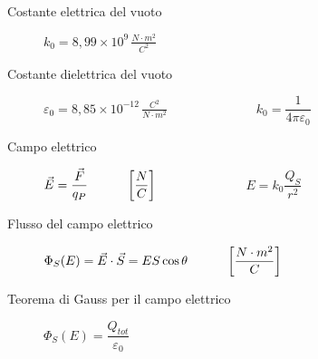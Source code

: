 \documentclass[a4paper,11pt,italian]{article}
\begin{document}
\begin{description}
   \item[Costante elettrica del vuoto ] $ k_0 = 8,99 \times 10^9 \, \frac{N\cdot m^2}{C^2} $
  
  \item[Costante dielettrica del vuoto] $ \varepsilon_0 = 8,85\times 10^{-12} \, \frac{C^2}{N \cdot m^2} $~~~~~~~~~~~~~~$ k_0 = \dfrac{1}{4 \pi \varepsilon_0} $
  

  \item[Campo elettrico] 
  $ \vec{E}  = \dfrac{\vec{F}}{q_P} \hspace*{3em} \left[ \dfrac{N}{C} \right] $~~~~~~~~~~~~~~$ E = k_0 \dfrac{Q_S}{r^2} $
    
  \item[Flusso del campo elettrico] 
  $ \Phi_S(E) = \vec{E} \cdot \vec{S} = ES \cos \theta \hspace*{3em} \left[ \dfrac{N\cdot m^2}{C} \right] $
  
    
  \item[Teorema di Gauss per il campo elettrico] 
  $ \Phi_S(E) = \dfrac{Q_{tot}}{\varepsilon_0} $
  

\end{description}
\end{document}
